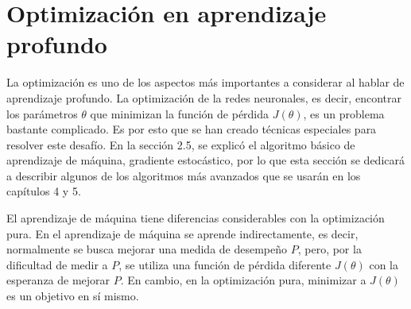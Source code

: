 

\section{Optimización en aprendizaje profundo}
La optimización es uno de los aspectos más importantes a considerar al hablar de aprendizaje profundo. La optimización de la redes neuronales, es decir, encontrar los parámetros $\theta$ que minimizan la función de pérdida $J(\theta)$, es un problema bastante complicado. Es por esto que se han creado técnicas especiales para resolver este desafío. En la sección 2.5, se explicó el algoritmo básico de aprendizaje de máquina, gradiente estocástico, por lo que esta sección se dedicará a describir algunos de los algoritmos más avanzados que se usarán en los capítulos 4 y 5.

\vspace{1em}

El aprendizaje de máquina tiene diferencias considerables con la optimización pura. En el aprendizaje de máquina se aprende indirectamente, es decir, normalmente se busca mejorar una medida de desempeño $P$, pero, por la dificultad de medir a $P$, se utiliza una función de pérdida diferente $J(\theta)$ con la esperanza de mejorar $P$. En cambio, en la optimización pura, minimizar a $J(\theta)$ es un objetivo en sí mismo.
\cite{goodfellow-et-al-2016}

